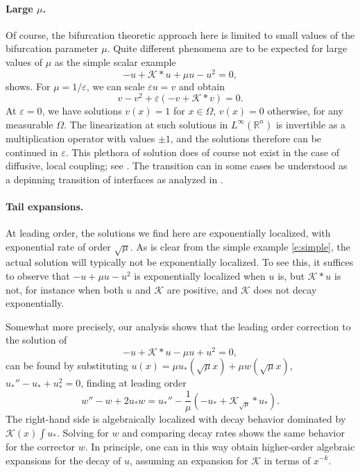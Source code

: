 \documentclass[10pt]{article}
\newcommand{\R}{\mathbb{R}}
\newcommand{\K}{\mathcal{K}}
\begin{document}
\paragraph{Large $\mu$.}
Of course, the bifurcation theoretic approach here is limited to small values of the bifurcation parameter $\mu$. Quite different phenomena are to be expected for large values of $\mu$ as the simple scalar example
\begin{equation}\label{e:simple}
-u+\K*u + \mu u - u^2=0,
\end{equation}
shows. For $\mu=1/\varepsilon$, we can scale $\varepsilon u =v$ and obtain
\[
v-v^2+\varepsilon(-v+\K*v)=0.
\]
At $\varepsilon=0$, we have solutions $v(x)=1$ for $x\in\Omega$, $v(x)=0$ otherwise, for any measurable $\Omega$. The linearization at such solutions in $L^\infty(\R^n)$ is invertible as a multiplication operator with values $\pm 1$, and the solutions therefore can be continued in $\varepsilon$. This plethora of solution does of course not exist in the case of diffusive, local coupling; see \cite{batespleth}. The transition can in some cases be understood as a depinning transition of interfaces as analyzed in \cite{pin}. 

\paragraph{Tail expansions.}
At leading order, the solutions we find here are exponentially localized, with exponential rate of order $\sqrt\mu$. As is clear from the simple example \eqref{e:simple}, the actual solution will typically not be exponentially localized. To see this, it suffices to observe that $-u+\mu u - u^2$ is exponentially localized when $u$ is, but $\K*u$ is not, for instance when both $u$ and $\K$ are positive, and $\K$ does not decay exponentially. 

Somewhat more precisely, our analysis shows that the leading order correction to the solution of 
\[
-u+\K*u-\mu u + u^2=0,
\]
can be found by substituting $u(x)=\mu u_*(\sqrt{\mu}x)+\mu w(\sqrt\mu x)$, $u_*''-u_*+u_*^2=0$,
finding at leading order 
\[
w''- w+2 u_*w=u_*''-\frac{1}{\mu}(-u_*+\K_{\sqrt{\mu}}*u_*).
\]
The right-hand side is algebraically localized with decay behavior dominated by $\K(x)\int u_*$. Solving for $ w$ and comparing decay rates shows the same behavior for the corrector $w$. In principle, one can in this way obtain higher-order algebraic expansions for the decay of $u$, assuming an expansion for $\K$ in terms of $x^{-k}$. 
\end{document}
